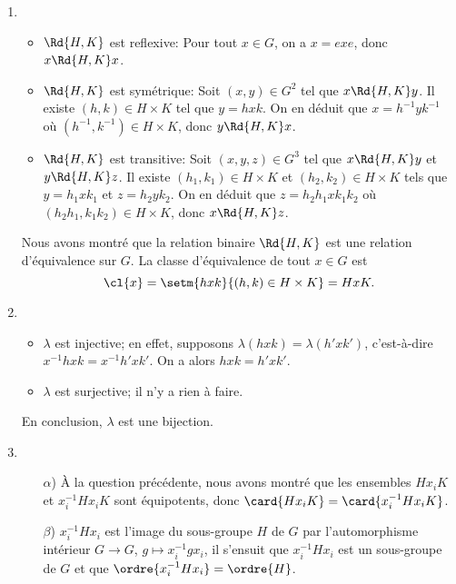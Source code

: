 \begin{enumerate}
  \item
    \begin{itemize}
      \item   
        $\Rd{H,K}$ est reflexive:
        Pour tout $x\in G$, on a $x = exe$, donc $x \Rd{H,K} x$.

      \item
        $\Rd{H,K}$ est symétrique:
        Soit $(x,y)\in G^2$ tel que $x \Rd{H,K} y$. Il existe $(h,k)\in
        H\times K$ tel que $y = hxk$. On en déduit que $x = h^{-1}yk^{-1}$ où
        $(h^{-1},k^{-1})\in H\times K$, donc $y \Rd{H,K} x$.

      \item
        $\Rd{H,K}$ est transitive:
        Soit $(x,y,z)\in G^3$ tel que $x \Rd{H,K} y$ et $y \Rd{H,K} z$. Il
        existe $(h_1,k_1)\in H\times K$ et $(h_2,k_2)\in H\times K$ tels que
        $y = h_1xk_1$ et $z = h_2yk_2$. On en déduit que $z = h_2h_1xk_1k_2$ où
        $(h_2h_1,k_1k_2)\in H\times K$, donc $x \Rd{H,K} z$.
    \end{itemize}

    Nous avons montré que la relation binaire $\Rd{H,K}$ est une relation
    d'équivalence sur $G$. La classe d'équivalence de tout $x\in G$ est
    \[
      \cl{x} = \setm{hxk}{(h,k)\in H\times K} = HxK.
    \]

  \item
    \begin{itemize}
      \item
        $\lambda$ est injective; en effet, supposons
        $\lambda(hxk) = \lambda(h'xk')$, c'est-à-dire
        $x^{-1}hxk = x^{-1}h'xk'$. On a alors $hxk = h'xk'$. 

      \item
        $\lambda$ est surjective; il n'y a rien à faire.
    \end{itemize}

    En conclusion, $\lambda$ est une bijection.

  \item
    \begin{enumerate}
      \item[$\alpha$)]
        À la question précédente, nous avons montré que les ensembles 
        $Hx_iK$ et $x_i^{-1}Hx_iK$ sont équipotents, donc 
        $\card{Hx_iK} = \card{x_i^{-1}Hx_iK}$.

      \item[$\beta$)]
        $x_i^{-1}Hx_i$ est l'image du sous-groupe $H$ de $G$ par l'automorphisme
        intérieur $G\to G$, $g\mapsto x_i^{-1}gx_i$, il s'ensuit que
        $x_i^{-1}Hx_i$ est un sous-groupe de $G$ et que
        $\ordre{x_i^{-1}Hx_i}=\ordre{H}$.


\end{enumerate}
\end{enumerate}
